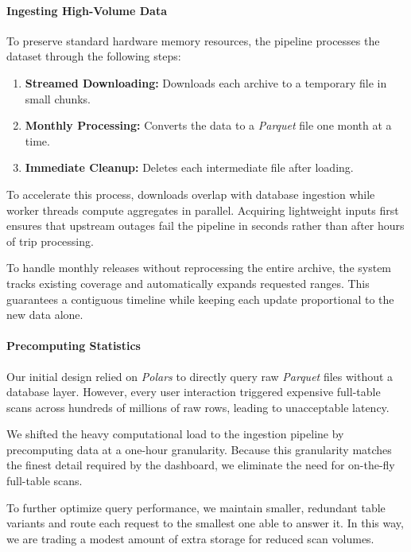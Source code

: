 \paragraph{Ingesting High-Volume Data}
To preserve standard hardware memory resources, the pipeline processes the dataset through the following steps:
\begin{enumerate}
    \item \textbf{Streamed Downloading:} Downloads each archive to a temporary file in small chunks.
    \item \textbf{Monthly Processing:} Converts the data to a \emph{Parquet} file one month at a time.
    \item \textbf{Immediate Cleanup:} Deletes each intermediate file after loading.
\end{enumerate}
To accelerate this process, downloads overlap with database ingestion while worker threads compute aggregates in parallel.
Acquiring lightweight inputs first ensures that upstream outages fail the pipeline in seconds rather than after hours of trip processing.

To handle monthly releases without reprocessing the entire archive, the system tracks existing coverage and automatically expands requested ranges.
This guarantees a contiguous timeline while keeping each update proportional to the new data alone.

\paragraph{Precomputing Statistics}
Our initial design relied on \emph{Polars} to directly query raw \emph{Parquet} files without a database layer.
However, every user interaction triggered expensive full-table scans across hundreds of millions of raw rows, leading to unacceptable latency.

We shifted the heavy computational load to the ingestion pipeline by precomputing data at a one-hour granularity.
Because this granularity matches the finest detail required by the dashboard, we eliminate the need for on-the-fly full-table scans.

To further optimize query performance, we maintain smaller, redundant table variants and route each request to the smallest one able to answer it.
In this way, we are trading a modest amount of extra storage for reduced scan volumes.

